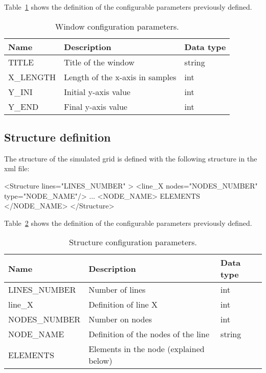 %
Table~\ref{tab:windows_conf} shows the definition of the configurable parameters previously defined. 
%
\begin{table}[h]
	\begin{center}	
	\begin{tabular}{|m{3.5cm}|m{10cm}|m{1cm}|} \hline		
		{\bf Name} 	& {\bf Description} 			   & {\bf Data type} 	\\ \hline
		TITLE		& Title of the window			   & string		\\ \hline
		X\_LENGTH	& Length of the x-axis in samples	   & int		\\ \hline
		Y\_INI		& Initial y-axis value	                   & int		\\ \hline
		Y\_END		& Final y-axis value    		   & int		\\ \hline	
	\end{tabular}
	\caption{Window configuration parameters.}
	\label{tab:windows_conf}
	\end{center}
\end{table}

%
\subsection{Structure definition}
\label{exe:str_def}

%
The structure of the simulated grid is defined with the following structure in the xml file:
%
\begin{code}
	<Structure lines="LINES_NUMBER" > 
		<line_X nodes="NODES_NUMBER" type="NODE_NAME"/>	
		...		
		<NODE_NAME>
			ELEMENTS								
		</NODE_NAME>
	</Structure>	
\end{code}

%
Table~\ref{tab:structure_conf} shows the definition of the configurable parameters previously defined. 
%
\begin{table}[h]
	\begin{center}	
	\begin{tabular}{|m{3.5cm}|m{10cm}|m{1cm}|} \hline		
		{\bf Name} 	& {\bf Description} 			   & {\bf Data type} 	\\ \hline
		LINES\_NUMBER	& Number of lines			   & int		\\ \hline
		line\_X  	& Definition of line X			   & int		\\ \hline
		NODES\_NUMBER	& Number on nodes                   	   & int		\\ \hline
		NODE\_NAME	& Definition of the nodes of the line      & string		\\ \hline
		ELEMENTS	& Elements in the node (explained below)   & 			\\ \hline	
	\end{tabular}
	\caption{Structure configuration parameters.}
	\label{tab:structure_conf}
	\end{center}
\end{table}

